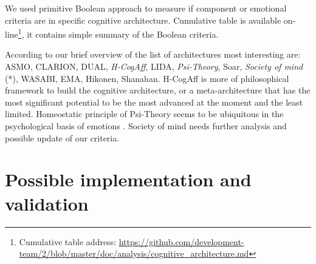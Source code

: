 We used primitive Boolean approach to measure if component or emotional criteria are in specific cognitive architecture. Cumulative table is available on-line\footnote{Cumulative table address: \url{https://github.com/development-team/2/blob/master/doc/analysis/cognitive_architecture.md}}, it contains simple summary of the Boolean criteria.

According to our brief overview of the list of architectures most interesting are: ASMO, CLARION, DUAL, \emph{H-CogAff}, LIDA, \emph{Psi-Theory}, Soar, \emph{Society of mind} (*), WASABI, EMA, Hikonen, Shanahan.
H-CogAff is more of philosophical framework to build the cognitive architecture, or a meta-architecture that has the most significant potential to be the most advanced at the moment and the least limited. Homeostatic principle of Psi-Theory seems to be ubiquitous in the psychological basis of emotions \cite{natureofemotions}. Society of mind needs further analysis and possible update of our criteria.

\section{Possible implementation and validation}

